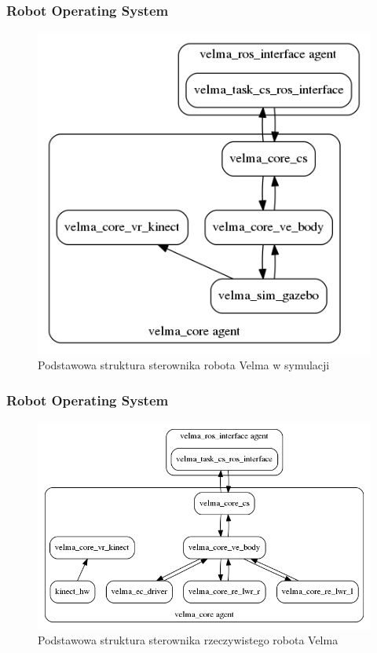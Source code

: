 \begin{frame}
	\frametitle{Robot Operating System}
	\begin{figure}
		\includegraphics[scale=0.4]{./images/system-sim.png}
		\caption{Podstawowa struktura sterownika robota Velma w symulacji}
	\end{figure}
\end{frame}


\begin{frame}
	\frametitle{Robot Operating System}
	\begin{figure}
		\includegraphics[scale=0.4]{./images/system-hw.png}
		\caption{Podstawowa struktura sterownika rzeczywistego robota Velma}
	\end{figure}
\end{frame}
	
